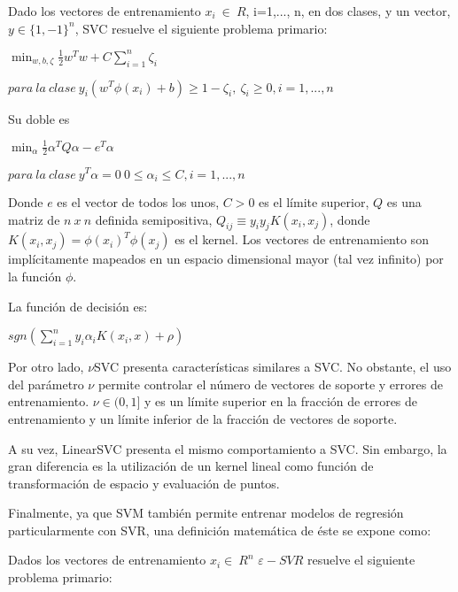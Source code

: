Dado los vectores de entrenamiento $x_{i}\ \in\ R$,
i=1,..., n, en dos clases, y un vector, $y \in \{1, -1\}^n$, SVC resuelve el siguiente problema primario:

\begin{center}
	$\min_ {w, b, \zeta} \frac{1}{2} w^T w + C \sum_{i=1}^{n} \zeta_i$
\end{center}
\begin{center}
	
	$para\ la\ clase\ y_i (w^T \phi (x_i) + b) \geq 1 - \zeta_i,\ \zeta_i \geq 0, i=1, ..., n$	
\end{center}

Su doble es

\begin{center}
	$\min_{\alpha} \frac{1}{2} \alpha^T Q \alpha - e^T \alpha$
\end{center}
\begin{center}
	$para\ la\ clase\ y^T \alpha = 0\ 0 \leq \alpha_i \leq C, i=1, ..., n$
\end{center}

Donde $e$ es el vector de todos los unos, $C > 0$ es el límite superior, $Q$ es una matriz de $n\ x\ n$ definida semipositiva, $Q_{ij} \equiv y_i y_j K(x_i, x_j)$, donde $K(x_i, x_j) = \phi (x_i)^T \phi (x_j)$ es el kernel. Los vectores de entrenamiento son implícitamente mapeados en un espacio dimensional mayor (tal vez infinito) por la función $\phi$.

La función de decisión es:

\begin{center}
	$sgn(\sum_{i=1}^n y_i \alpha_i K(x_i, x) + \rho)$
\end{center}

Por otro lado, $\nu$SVC presenta características similares a SVC. No obstante, el uso del parámetro $\nu$ permite controlar el número de vectores de soporte y errores de entrenamiento. $\nu \in (0, 1]$ y  es un límite superior en la fracción de errores de entrenamiento y un límite inferior de la fracción de vectores de soporte.

A su vez, LinearSVC presenta el mismo comportamiento a SVC. Sin embargo, la gran diferencia es la utilización de un kernel lineal como función de transformación de espacio y evaluación de puntos.

Finalmente, ya que SVM también permite entrenar modelos de regresión particularmente con SVR, una definición matemática de éste se expone como:

Dados los vectores de entrenamiento  $x_{i} \in\ R^n$  
$\varepsilon-SVR$ \cite{smola2004tutorial} resuelve el siguiente problema primario:

